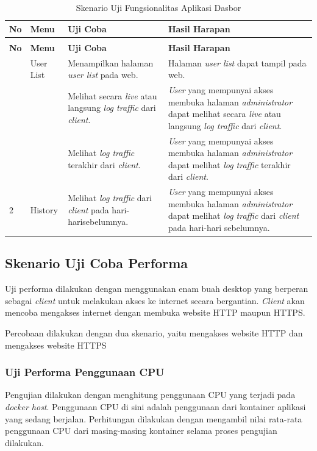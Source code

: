 \begin{longtable}{|p{}|p{}|p{}|p{}|}
	\caption{Skenario Uji Fungsionalitas Aplikasi Halaman \textit{Administrator}} \label{ujicoba5} \\
	\hline
	\textbf{No} & \textbf{Menu} & \textbf{Uji Coba} & \textbf{Hasil Harapan} \\ \hline
	\endfirsthead
	\caption[]{Skenario Uji Fungsionalitas Aplikasi Dasbor}  \\
	\hline
	\textbf{No} & \textbf{Menu} & \textbf{Uji Coba} & \textbf{Hasil Harapan} \\ \hline
	\endhead
	\endfoot
	\endlastfoot
	1 & User List & Menampilkan halaman \textit{user list} pada web. & Halaman \textit{user list} dapat tampil pada web. \\ \cline{3-4}
	&& Melihat secara \textit{live} atau langsung \textit{log traffic} dari \textit{client}. & \textit{User} yang mempunyai akses membuka halaman \textit{administrator} dapat melihat secara \textit{live} atau langsung \textit{log traffic} dari \textit{client}. \\ \cline{3-4}
	&& Melihat \textit{log traffic} terakhir dari \textit{client}. & \textit{User} yang mempunyai akses membuka halaman \textit{administrator} dapat melihat \textit{log traffic} terakhir dari \textit{client}. \\ \hline
	2 & History & Melihat \textit{log traffic} dari \textit{client} pada hari-harisebelumnya.  & \textit{User} yang mempunyai akses membuka halaman \textit{administrator} dapat melihat \textit{log traffic} dari \textit{client} pada hari-hari sebelumnya. \\ \hline
\end{longtable}

\subsection{Skenario Uji Coba Performa}
Uji performa dilakukan dengan menggunakan enam buah desktop yang berperan sebagai \textit{client} untuk melakukan akses ke internet secara bergantian. \textit{Client} akan mencoba mengakses internet dengan membuka website HTTP maupun HTTPS.

Percobaan dilakukan dengan dua skenario, yaitu mengakses website HTTP dan mengakses website HTTPS

\subsubsection{Uji Performa Penggunaan CPU}
Pengujian dilakukan dengan menghitung penggunaan CPU yang terjadi pada \textit{docker host}. Penggunaan CPU di sini adalah penggunaan dari kontainer aplikasi yang sedang berjalan. Perhitungan dilakukan dengan mengambil nilai rata-rata penggunaan CPU dari masing-masing kontainer selama proses pengujian dilakukan.


